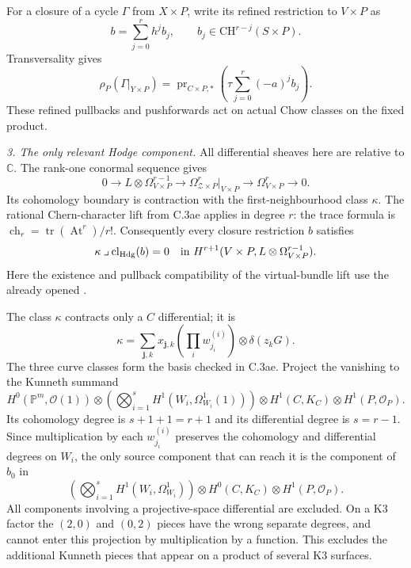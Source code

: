 For a closure of a cycle $\Gamma$ from $X\times P$,
write its refined restriction to $V\times P$ as
\[
 b=\sum_{j=0}^r h^j b_j,
 \qquad b_j\in\mathrm{CH}^{r-j}(S\times P).
\]
Transversality gives
\begin{equation}\label{eq:C3af-invariant}
 \rho_P(\Gamma|_{Y\times P})
       =\operatorname{pr}_{C\times P,*}
          \left(\tau\sum_{j=0}^r(-a)^j b_j\right).
\end{equation}
These refined pullbacks and pushforwards act on
actual Chow classes on the fixed product.

\emph{3. The only relevant Hodge component.}
All differential sheaves here are relative to
$\mathbb C$. The rank-one conormal sequence gives
\[
 0\longrightarrow L\otimes\Omega^{r-1}_{V\times P}
 \longrightarrow\Omega^r_{\mathcal Z\times P}|_{V\times P}
 \longrightarrow\Omega^r_{V\times P}\longrightarrow0.
\]
Its cohomology boundary is contraction with the
first-neighbourhood class $\kappa$. The rational
Chern-character lift from C.3ae applies in degree $r$:
the trace formula is
$\operatorname{ch}_r=\operatorname{tr}(\operatorname{At}^r)/r!$.
Consequently every closure restriction $b$ satisfies
\[
       \kappa\mathbin{\lrcorner}\operatorname{cl}_{\mathrm{Hdg}}(b)
                  =0\quad\hbox{in }
       H^{r+1}(V\times P,L\otimes\Omega^{r-1}_{V\times P}).
\]
Here the existence and pullback compatibility of the
virtual-bundle lift use the already opened
\citet[Lemma 42.58.1, Tag 0FEY;
Remark 42.59.9, Tag 0FF8]{cyStacksChernObstruction}.

The class $\kappa$ contracts only a $C$ differential;
it is
\[
          \kappa=\sum_{\mathbf j,k}x_{\mathbf j,k}
                   \left(\prod_i w^{(i)}_{j_i}\right)
                     \otimes\delta(z_kG).
\]
The three curve classes form the basis checked in
C.3ae. Project the vanishing to the Kunneth summand
\[
 H^0(\mathbb P^m,\mathcal O(1))\otimes
 \left(\bigotimes_{i=1}^sH^1(W_i,\Omega^1_{W_i}(1))\right)
 \otimes H^1(C,K_C)\otimes H^1(P,\mathcal O_P).
\]
Its cohomology degree is $s+1+1=r+1$ and its
differential degree is $s=r-1$. Since multiplication
by each $w^{(i)}_{j_i}$ preserves the cohomology and
differential degrees on $W_i$, the only source
component that can reach it is the component of $b_0$
in
\begin{equation}\label{eq:C3af-source}
 \left(\bigotimes_{i=1}^sH^1(W_i,\Omega^1_{W_i})\right)
         \otimes H^0(C,K_C)\otimes H^1(P,\mathcal O_P).
\end{equation}
All components involving a projective-space
differential are excluded. On a K3 factor the
$(2,0)$ and $(0,2)$ pieces have the wrong separate
degrees, and cannot enter this projection by
multiplication by a function. This excludes the
additional Kunneth pieces that appear on a product
of several K3 surfaces.

